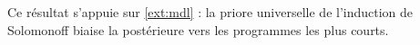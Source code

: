Ce résultat s'appuie sur \ref{ext:mdl} : la priore universelle de l'induction de Solomonoff biaise la
postérieure vers les programmes les plus courts.
